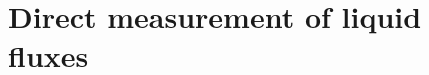 %
%
%
%
%
%
%
%
%
%
%





\clearpage

\section{Direct measurement of liquid fluxes}
\label{sec:ch5_direct_measurement_fluxes_IB}

